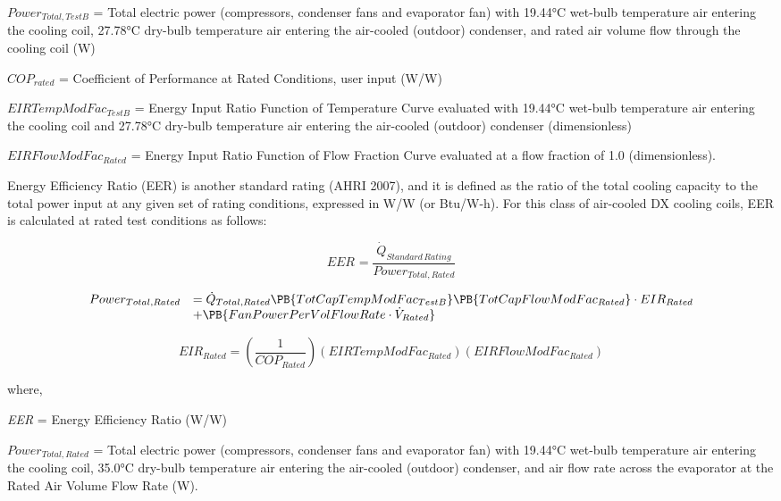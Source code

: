 \(Powe{r_{Total,TestB}}\) = Total electric power (compressors, condenser fans and evaporator fan) with 19.44°C wet-bulb temperature air entering the cooling coil, 27.78°C dry-bulb temperature air entering the air-cooled (outdoor) condenser, and rated air volume flow through the cooling coil (W)

\(CO{P_{rated}}\) = Coefficient of Performance at Rated Conditions, user input (W/W)

\(EIRTempModFa{c_{TestB}}\) = Energy Input Ratio Function of Temperature Curve evaluated with 19.44°C wet-bulb temperature air entering the cooling coil and 27.78°C dry-bulb temperature air entering the air-cooled (outdoor) condenser (dimensionless)

\(EIRFlowModFa{c_{Rated}}\) = Energy Input Ratio Function of Flow Fraction Curve evaluated at a flow fraction of 1.0 (dimensionless).

Energy Efficiency Ratio (EER) is another standard rating (AHRI 2007), and it is defined as the ratio of the total cooling capacity to the total power input at any given set of rating conditions, expressed in W/W (or Btu/W-h). For this class of air-cooled DX cooling coils, EER is calculated at rated test conditions as follows:

\begin{equation}
EE{R_{}} = \frac{{{{\dot Q}_{Standard\,Rating}}}}{{Powe{r_{Total,Rated}}}}
\end{equation}

\begin{equation}
  \begin{array}{rl}
    Power_{Total,Rated} &= \dot{Q}_{Total,Rated} \PB{TotCapTempModFac_{TestB}}\PB{TotCapFlowModFac_{Rated}}\cdot EIR_{Rated} \\
                        &+ \PB{FanPowerPerVolFlowRate \cdot \dot{V}_{Rated}}
  \end{array}
\end{equation}

\begin{equation}
EI{R_{Rated}} = \left( {\frac{1}{{CO{P_{Rated}}}}} \right)(EIRTempModFa{c_{Rated}})(EIRFlowModFa{c_{Rated}})
\end{equation}

where,

\emph{EER} = Energy Efficiency Ratio (W/W)

\(Powe{r_{Total,Rated}}\) = Total electric power (compressors, condenser fans and evaporator fan) with 19.44°C wet-bulb temperature air entering the cooling coil, 35.0°C dry-bulb temperature air entering the air-cooled (outdoor) condenser, and air flow rate across the evaporator at the Rated Air Volume Flow Rate (W).

